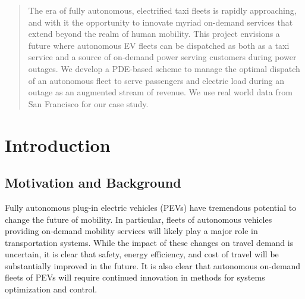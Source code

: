 \documentclass[journal]{IEEEtran}
\begin{document}




\maketitle


\begin{abstract}
The era of fully autonomous, electrified taxi fleets is rapidly approaching, and with it the opportunity to innovate myriad on-demand services that extend beyond the realm of human mobility. This project envisions a future where autonomous EV fleets can be dispatched as both as a taxi service and a source of on-demand power serving customers during power outages. We develop a PDE-based scheme to manage the optimal dispatch of an autonomous fleet to serve passengers and electric load during an outage as an augmented stream of revenue. We use real world data from San Francisco for our case study.
\end{abstract}




%
\IEEEpeerreviewmaketitle

\section{Introduction}

\subsection{Motivation and Background}
Fully autonomous plug-in electric vehicles (PEVs) have tremendous potential to change the future of mobility. In particular, fleets of autonomous vehicles providing on-demand mobility services will likely play a major role in transportation systems. While the impact of these changes on travel demand is uncertain, it is clear that safety, energy efficiency, and cost of travel will be substantially improved in the future. It is also clear that autonomous on-demand fleets of PEVs will require continued innovation in methods for systems optimization and control.
\end{document}
